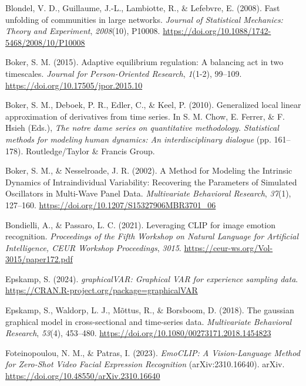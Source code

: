 \documentclass[
]{article}
\newlength{\cslhangindent}
\newenvironment{CSLReferences}[2] %
 {\begin{list}{}{%
  \setlength{\itemindent}{0pt}
  \setlength{\leftmargin}{0pt}
  \setlength{\parsep}{0pt}
  \ifodd #1
   \setlength{\leftmargin}{\cslhangindent}
   \setlength{\itemindent}{-1\cslhangindent}
  \fi
  \setlength{\itemsep}{#2\baselineskip}}}
 {\end{list}}
\begin{document}
\label{refs}
\begin{CSLReferences}{1}{0}
Blondel, V. D., Guillaume, J.-L., Lambiotte, R., \& Lefebvre, E. (2008).
Fast unfolding of communities in large networks. \emph{Journal of
Statistical Mechanics: Theory and Experiment}, \emph{2008}(10), P10008.
\url{https://doi.org/10.1088/1742-5468/2008/10/P10008}

Boker, S. M. (2015). Adaptive equilibrium regulation: {A} balancing act
in two timescales. \emph{Journal for Person-Oriented Research},
\emph{1}(1-2), 99--109. \url{https://doi.org/10.17505/jpor.2015.10}

Boker, S. M., Deboek, P. R., Edler, C., \& Keel, P. (2010). Generalized
local linear approximation of derivatives from time series. In S. M.
Chow, E. Ferrer, \& F. Hsieh (Eds.), \emph{The notre dame series on
quantitative methodology. Statistical methods for modeling human
dynamics: An interdisciplinary dialogue} (pp. 161--178).
Routledge/Taylor \& Francis Group.

Boker, S. M., \& Nesselroade, J. R. (2002). A {Method} for {Modeling}
the {Intrinsic Dynamics} of {Intraindividual Variability}: {Recovering}
the {Parameters} of {Simulated Oscillators} in {Multi-Wave Panel Data}.
\emph{Multivariate Behavioral Research}, \emph{37}(1), 127--160.
\url{https://doi.org/10.1207/S15327906MBR3701_06}

Bondielli, A., \& Passaro, L. C. (2021). Leveraging {CLIP} for image
emotion recognition. \emph{Proceedings of the Fifth Workshop on Natural
Language for Artificial Intelligence, CEUR Workshop Proceedings},
\emph{3015}. \url{https://ceur-ws.org/Vol-3015/paper172.pdf}

Epskamp, S. (2024). \emph{graphicalVAR: Graphical VAR for experience
sampling data}. \url{https://CRAN.R-project.org/package=graphicalVAR}

Epskamp, S., Waldorp, L. J., Mõttus, R., \& Borsboom, D. (2018). The
gaussian graphical model in cross-sectional and time-series data.
\emph{Multivariate Behavioral Research}, \emph{53}(4), 453--480.
\url{https://doi.org/10.1080/00273171.2018.1454823}

Foteinopoulou, N. M., \& Patras, I. (2023). \emph{{EmoCLIP}: {A
Vision-Language Method} for {Zero-Shot Video Facial Expression
Recognition}} (arXiv:2310.16640). {arXiv}.
\url{https://doi.org/10.48550/arXiv.2310.16640}


\end{CSLReferences}
\end{document}
